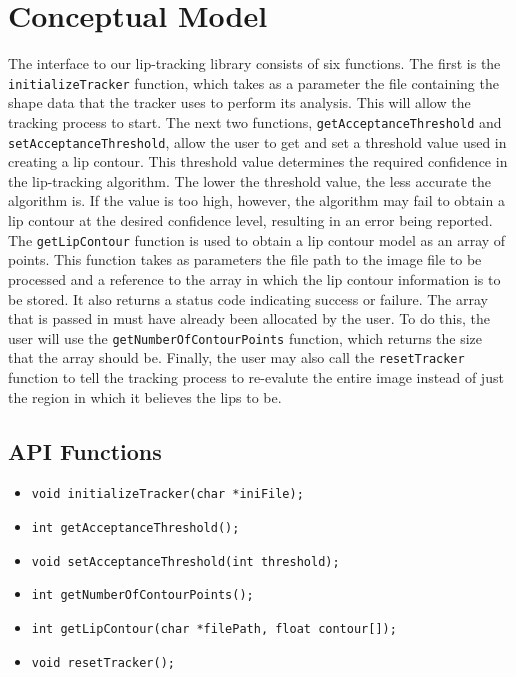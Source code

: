 \chapter{Conceptual Model}

The interface to our lip-tracking library consists of six functions. The first is the \texttt{initializeTracker} function, which takes as a parameter the file containing the shape data that the tracker uses to perform its analysis. This will allow the tracking process to start. The next two functions, \texttt{getAcceptanceThreshold} and \texttt{setAcceptanceThreshold}, allow the user to get and set a threshold value used in creating a lip contour. This threshold value determines the required confidence in the lip-tracking algorithm. The lower the threshold value, the less accurate the algorithm is. If the value is too high, however, the algorithm may fail to obtain a lip contour at the desired confidence level, resulting in an error being reported. The \texttt{getLipContour} function is used to obtain a lip contour model as an array of points. This function takes as parameters the file path to the image file to be processed and a reference to the array in which the lip contour information is to be stored. It also returns a status code indicating success or failure. The array that is passed in must have already been allocated by the user. To do this, the user will use the \texttt{getNumberOfContourPoints} function, which returns the size that the array should be. Finally, the user may also call the \texttt{resetTracker} function to tell the tracking process to re-evalute the entire image instead of just the region in which it believes the lips to be.

\section{API Functions}
\begin{itemize}
\item \texttt{void initializeTracker(char *iniFile);}
\item \texttt{int getAcceptanceThreshold();}
\item \texttt{void setAcceptanceThreshold(int threshold);}
\item \texttt{int getNumberOfContourPoints();}
\item \texttt{int getLipContour(char *filePath, float contour[]);}
\item \texttt{void resetTracker();}
\end{itemize}